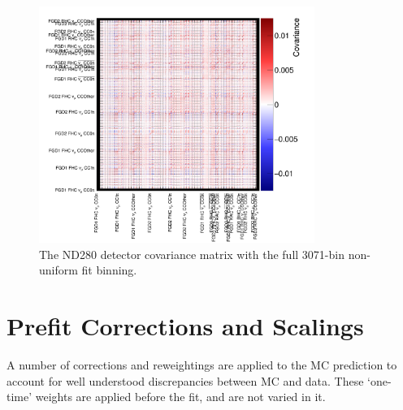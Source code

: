 \begin{figure}[!htbp]
\centering
\includegraphics*[width=0.8\textwidth,clip]{figs/detcovFit}
\caption{The ND280 detector covariance matrix with the full 3071-bin non-uniform fit binning.}\label{fig:detcorrFit}
\end{figure}

\section{Prefit Corrections and Scalings}\label{sec:corr}

A number of corrections and reweightings are applied to the MC prediction to account for well understood discrepancies between MC and data. These `one-time' weights are applied before the fit, and are not varied in it. 

